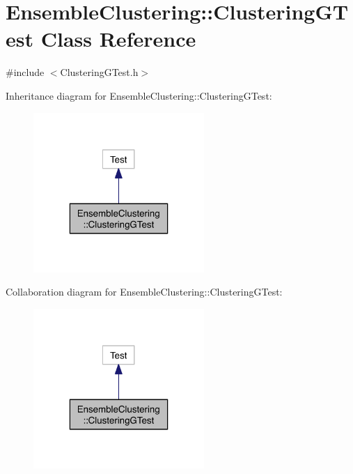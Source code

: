 \hypertarget{class_ensemble_clustering_1_1_clustering_g_test}{\section{Ensemble\-Clustering\-:\-:Clustering\-G\-Test Class Reference}
\label{class_ensemble_clustering_1_1_clustering_g_test}
}


{\ttfamily \#include $<$Clustering\-G\-Test.\-h$>$}



Inheritance diagram for Ensemble\-Clustering\-:\-:Clustering\-G\-Test\-:
\nopagebreak
\begin{figure}[H]
\begin{center}
\leavevmode
\includegraphics[width=184pt]{class_ensemble_clustering_1_1_clustering_g_test__inherit__graph}
\end{center}
\end{figure}


Collaboration diagram for Ensemble\-Clustering\-:\-:Clustering\-G\-Test\-:
\nopagebreak
\begin{figure}[H]
\begin{center}
\leavevmode
\includegraphics[width=184pt]{class_ensemble_clustering_1_1_clustering_g_test__coll__graph}
\end{center}
\end{figure}


